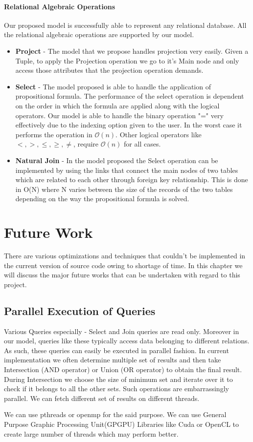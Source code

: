 \documentclass[12pt, oneside]{book}
\begin{document}
\subsubsection{Relational Algebraic Operations}
Our proposed model is successfully able to represent any relational database. All the relational algebraic operations are supported by our model.
\begin{itemize}
 \item \textbf{Project} - The model that we propose handles projection very easily. Given a Tuple, to apply the Projection operation we go to it's Main node and only access those attributes that the projection operation demands.
 \item \textbf{Select} - The model proposed is able to handle the application of propositional formula. The performance of the select operation is dependent on the order in which the formula are applied along with the logical operators. Our model is able to handle the binary operation "=" very effectively due to the indexing option given to the user. In the worst case it performs the operation in $\mathcal{O}(n)$. Other logical operators like $ <, >, \leq, \geq, \neq$,  require $\mathcal{O}(n)$ for all cases.
 \item \textbf{Natural Join} - In the model proposed the Select operation can be implemented by using the links that connect the main nodes of two tables which are related to each other through foreign key relationship. This is done in O(N) where N varies between the size of the records of the two tables depending on the way the propositional formula is solved.
\end{itemize}


\chapter{Future Work}
There are various optimizations and techniques that couldn't be implemented in the current version of source code owing to shortage of time. In this chapter we will discuss the major future works that can be undertaken with regard to this project.
\section{Parallel Execution of Queries}
Various Queries especially - Select and Join queries are read only. Moreover in our model, queries like these typically access data belonging to different relations. As such, these queries can easily be executed in parallel fashion. In current implementation we often determine multiple set of results and then take Intersection (AND operator) or Union (OR operator) to obtain the final result. During Intersection we choose the size of minimum set and iterate over it to check if it belongs to all the other sets. Such operations are embarrassingly parallel. We can fetch different set of results on different threads. \par
We can use pthreads or openmp for the said purpose. We can use General Purpose Graphic Processing Unit(GPGPU) Libraries like Cuda or OpenCL to create large number of threads which may perform better.
\end{document}
